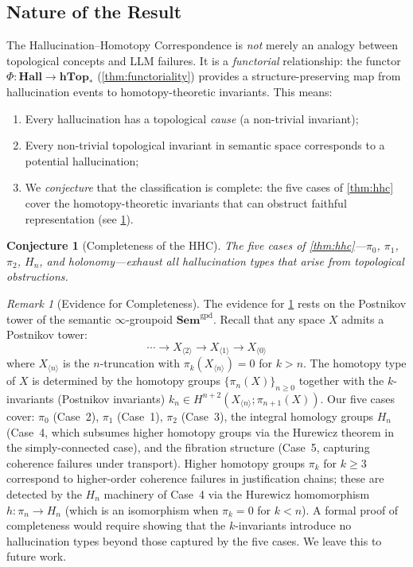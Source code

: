 \documentclass[11pt,a4paper]{article}
\theoremstyle{plain}
\newtheorem{conjecture}[theorem]{Conjecture}
\theoremstyle{definition}
\theoremstyle{remark}
\newtheorem{remark}[theorem]{Remark}
\newcommand{\Sem}{\mathbf{Sem}}
\newcommand{\Hall}{\mathbf{Hall}}
\newcommand{\hTop}{\mathbf{hTop}_*}
\begin{document}
\subsection{Nature of the Result}

The Hallucination--Homotopy Correspondence is \emph{not} merely an analogy between topological concepts and LLM failures. It is a \emph{functorial} relationship: the functor $\Phi: \Hall \to \hTop$ (\cref{thm:functoriality}) provides a structure-preserving map from hallucination events to homotopy-theoretic invariants. This means:

\begin{enumerate}[nosep]
  \item Every hallucination has a topological \emph{cause} (a non-trivial invariant);
  \item Every non-trivial topological invariant in semantic space corresponds to a potential hallucination;
  \item We \emph{conjecture} that the classification is complete: the five cases of \cref{thm:hhc} cover the homotopy-theoretic invariants that can obstruct faithful representation (see \cref{conj:completeness}).
\end{enumerate}

\begin{conjecture}[Completeness of the HHC]
\label{conj:completeness}
The five cases of \cref{thm:hhc}---$\pi_0$, $\pi_1$, $\pi_2$, $H_n$, and holonomy---exhaust all hallucination types that arise from topological obstructions.
\end{conjecture}

\begin{remark}[Evidence for Completeness]
\label{rem:completeness-evidence}
The evidence for \cref{conj:completeness} rests on the Postnikov tower of the semantic $\infty$-groupoid $\Sem^{\mathrm{gpd}}$. Recall that any space $X$ admits a Postnikov tower:
\[
\cdots \to X_{\langle 2 \rangle} \to X_{\langle 1 \rangle} \to X_{\langle 0 \rangle}
\]
where $X_{\langle n \rangle}$ is the $n$-truncation with $\pi_k(X_{\langle n \rangle}) = 0$ for $k > n$. The homotopy type of $X$ is determined by the homotopy groups $\{\pi_n(X)\}_{n \geq 0}$ together with the $k$-invariants (Postnikov invariants) $k_n \in H^{n+2}(X_{\langle n \rangle}; \pi_{n+1}(X))$. Our five cases cover: $\pi_0$ (Case~2), $\pi_1$ (Case~1), $\pi_2$ (Case~3), the integral homology groups $H_n$ (Case~4, which subsumes higher homotopy groups via the Hurewicz theorem in the simply-connected case), and the fibration structure (Case~5, capturing coherence failures under transport). Higher homotopy groups $\pi_k$ for $k \geq 3$ correspond to higher-order coherence failures in justification chains; these are detected by the $H_n$ machinery of Case~4 via the Hurewicz homomorphism $h: \pi_n \to H_n$ (which is an isomorphism when $\pi_k = 0$ for $k < n$). A formal proof of completeness would require showing that the $k$-invariants introduce no hallucination types beyond those captured by the five cases. We leave this to future work.
\end{remark}
\end{document}
